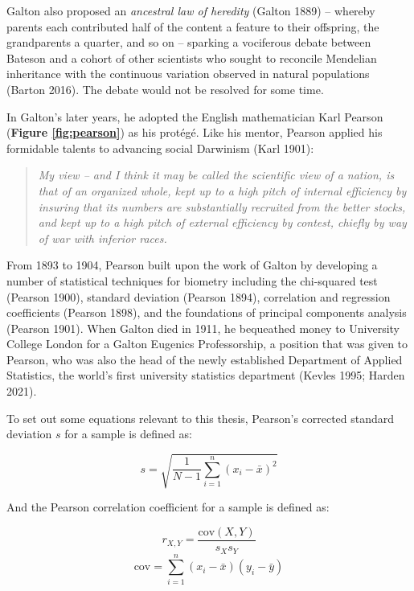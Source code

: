 \documentclass[
]{book}
\begin{document}
Galton also proposed an \emph{ancestral law of heredity} (Galton 1889) -- whereby parents each contributed half of the content a feature to their offspring, the grandparents a quarter, and so on -- sparking a vociferous debate between Bateson and a cohort of other scientists who sought to reconcile Mendelian inheritance with the continuous variation observed in natural populations (Barton 2016). The debate would not be resolved for some time.

In Galton's later years, he adopted the English mathematician Karl Pearson (\textbf{Figure \ref{fig:pearson}}) as his protégé. Like his mentor, Pearson applied his formidable talents to advancing social Darwinism (Karl 1901):

\begin{quote}
\emph{My view -- and I think it may be called the scientific view of a nation, is that of an organized whole, kept up to a high pitch of internal efficiency by insuring that its numbers are substantially recruited from the better stocks, and kept up to a high pitch of external efficiency by contest, chiefly by way of war with inferior races.}
\end{quote}

From 1893 to 1904, Pearson built upon the work of Galton by developing a number of statistical techniques for biometry including the chi-squared test (Pearson 1900), standard deviation (Pearson 1894), correlation and regression coefficients (Pearson 1898), and the foundations of principal components analysis (Pearson 1901). When Galton died in 1911, he bequeathed money to University College London for a Galton Eugenics Professorship, a position that was given to Pearson, who was also the head of the newly established Department of Applied Statistics, the world's first university statistics department (Kevles 1995; Harden 2021).

To set out some equations relevant to this thesis, Pearson's corrected standard deviation \(s\) for a sample is defined as:

\begin{equation}
s = \sqrt{\frac{1}{N-1}{\sum_{i=1} ^n (x_i - \bar{x})^2}} \label{eq:sd}
\end{equation}

And the Pearson correlation coefficient for a sample is defined as:

\begin{equation}
r_{X,Y} = \frac{\mathrm{cov}(X,Y)}{s_X s_Y} \label{eq:cor}
\end{equation}
\begin{equation}
\mathrm{cov} = \sum_{i=1} ^n (x_i - \bar{x})(y_i - \bar{y})
\end{equation}
\end{document}
